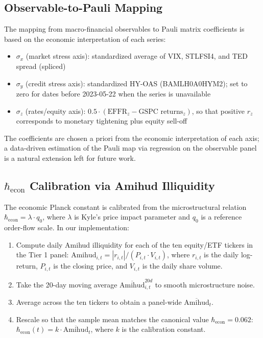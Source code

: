 \subsection{Observable-to-Pauli Mapping}\label{sec:pauli-mapping}

The mapping from macro-financial observables to Pauli matrix coefficients is
based on the economic interpretation of each series:
\begin{itemize}
    \item $\sigma_x$ (market stress axis): standardized average of VIX, STLFSI4,
        and TED spread (spliced)
    \item $\sigma_y$ (credit stress axis): standardized HY-OAS (BAMLH0A0HYM2);
        set to zero for dates before 2023-05-22 when the series is unavailable
    \item $\sigma_z$ (rates/equity axis): $0.5 \cdot (\text{EFFR}_z
        - \text{GSPC returns}_z)$, so that positive $r_z$ corresponds to
        monetary tightening plus equity sell-off
\end{itemize}

The coefficients are chosen a priori from the economic interpretation of each
axis; a data-driven estimation of the Pauli map via regression on the observable
panel is a natural extension left for future work.

\subsection{$\hbar_{\mathrm{econ}}$ Calibration via Amihud Illiquidity}
\label{sec:hbar-calibration}

The economic Planck constant is calibrated from the microstructural relation
$\hbar_{\mathrm{econ}} = \lambda \cdot q_0$, where $\lambda$ is Kyle's price
impact parameter and $q_0$ is a reference order-flow scale. In our
implementation:
\begin{enumerate}
    \item[(1)] Compute daily Amihud illiquidity for each of the ten
        equity/ETF tickers in the Tier 1 panel:
        $\text{Amihud}_{i,t} = |r_{i,t}| / (P_{i,t} \cdot V_{i,t})$, where
        $r_{i,t}$ is the daily log-return, $P_{i,t}$ is the closing price,
        and $V_{i,t}$ is the daily share volume.
    \item[(2)] Take the 20-day moving average
        $\overline{\text{Amihud}}_{i,t}^{20d}$ to smooth microstructure noise.
    \item[(3)] Average across the ten tickers to obtain a panel-wide
        $\overline{\text{Amihud}}_t$.
    \item[(4)] Rescale so that the sample mean matches the canonical value
        $\hbar_{\mathrm{econ}} = 0.062$:
        $\hbar_{\mathrm{econ}}(t) = k \cdot \overline{\text{Amihud}}_t$,
        where $k$ is the calibration constant.
\end{enumerate}

